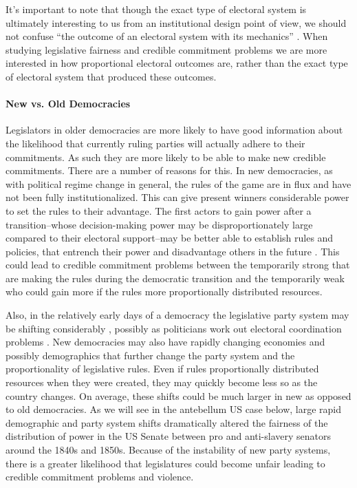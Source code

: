 \documentclass[a4paper]{article}\usepackage[]{graphicx}\usepackage[]{color}
\begin{document}
It's important to note that though the exact type of electoral system is ultimately interesting to us from an institutional design point of view, we should not confuse ``the outcome of an electoral system with its mechanics'' \citep[][109]{Golder2005}. When studying legislative fairness and credible commitment problems we are more interested in how proportional electoral outcomes are, rather than the exact type of electoral system that produced these outcomes.

\paragraph{New vs. Old Democracies}

Legislators in older democracies are more likely to have good information about the likelihood that currently ruling parties will actually adhere to their commitments. As such they are more likely to be able to make new credible commitments. There are a number of reasons for this. In new democracies, as with political regime change in general, the rules of the game are in flux and have not been fully institutionalized. This can give present winners considerable power to set the rules to their advantage. The first actors to gain power after a transition--whose decision-making power may be disproportionately large compared to their electoral support--may be better able to establish rules and policies, that entrench their power and disadvantage others in the future \cite[108]{Saideman2002}. This could lead to credible commitment problems between the temporarily strong that are making the rules during the democratic transition and the temporarily weak who could gain more if the rules more proportionally distributed resources.

Also, in the relatively early days of a democracy the legislative party system may be shifting considerably \cite[161]{Mainwaring2007b}, possibly as politicians work out electoral coordination problems \citep{cox1997}. New democracies may also have rapidly changing economies and possibly demographics that further change the party system and the proportionality of legislative rules. Even if rules proportionally distributed resources when they were created, they may quickly become less so as the country changes. On average, these shifts could be much larger in new as opposed to old democracies. As we will see in the antebellum US case below, large rapid demographic and party system shifts dramatically altered the fairness of the distribution of power in the US Senate between pro and anti-slavery senators around the 1840s and 1850s. Because of the instability of new party systems, there is a greater likelihood that legislatures could become unfair leading to credible commitment problems and violence.
\end{document}
